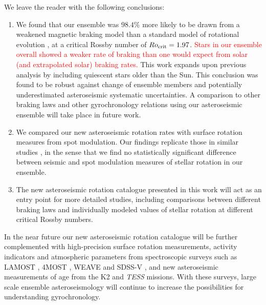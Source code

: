\documentclass[12pt]{article}
\newcommand{\tess}{\emph{TESS}\xspace}
\newcommand{\ktwo}{K2\xspace}
\newcommand{\rtwo}[1]{\textcolor{red}{{#1}}}
\begin{document}
We leave the reader with the following conclusions:
\begin{enumerate}
	\item We found that our ensemble was $98.4\%$ more likely to be drawn from a weakened magnetic braking model than a standard model of rotational evolution \cite{vansaders+pinsonneault2013}, at a critical Rossby number of $Ro_{\rm{crit}} = 1.97$. \rtwo{Stars in our ensemble overall showed a weaker rate of braking than one would expect from solar (and extrapolated solar) braking rates.} This work expands upon previous analysis \cite{vansaders+2019} by including quiescent stars older than the Sun. This conclusion was found to be robust against change of ensemble members and potentially underestimated asteroseismic systematic uncertainties. A comparison to other braking laws \cite{matt+2015} and other gyrochronology relations \cite{barnes2010} using our asteroseismic ensemble will take place in future work.
	
	\item We compared our new asteroseismic rotation rates with surface rotation measures from spot modulation. Our findings replicate those in similar studies \cite{nielsen+2015,benomar+2015}, in the sense that we find no statistically significant difference between seismic and spot modulation measures of stellar rotation in our ensemble.
	
	\item The new asteroseismic rotation catalogue presented in this work will act as an entry point for more detailed studies, including comparisons between different braking laws and individually modeled values of stellar rotation at different critical Rossby numbers.
	
\end{enumerate}

In the near future our new asteroseismic rotation catalogue will be further complemented with high-precision surface rotation measurements, activity indicators and atmospheric parameters from spectroscopic surveys such as LAMOST \cite{deng+2012}, 4MOST \cite{dejong+2014}, WEAVE \cite{dalton+2014} and SDSS-V \cite{blanton+2019, kollmeier+2019}, and new asteroseismic measurements of age from the \ktwo and \tess missions. With these surveys, large scale ensemble asteroseismology will continue to increase the possibilities for understanding gyrochronology.\\


%
\end{document}
